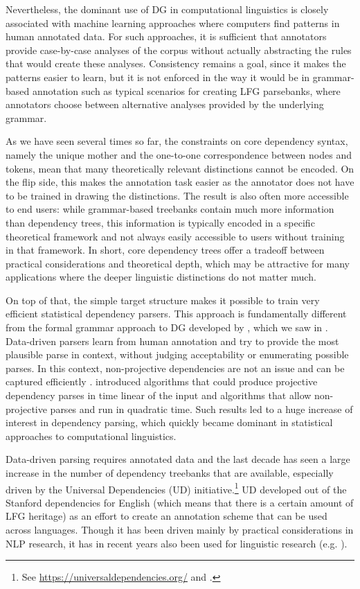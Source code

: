 \documentclass[output=paper,hidelinks]{langscibook}
\begin{document}
Nevertheless, the dominant use of DG in computational linguistics is
closely associated with machine learning approaches where computers
find patterns in human annotated data. For such approaches, it is
sufficient that annotators provide case-by-case analyses of the corpus
without actually abstracting the rules that would create these
analyses. Consistency remains a goal, since it makes the patterns
easier to learn, but it is not enforced in the way it would be in
grammar-based annotation such as typical scenarios for creating LFG
parsebanks, where annotators choose between alternative analyses
provided by the underlying grammar.

As we have seen several times so far, the constraints on core
dependency syntax, namely the unique mother and the one-to-one
correspondence between nodes and tokens, mean that many theoretically
relevant distinctions cannot be encoded. On the flip side, this makes
the annotation task easier as the annotator does not have to be
trained in drawing the distinctions. The result is also often more
accessible to end users: while grammar-based treebanks contain much
more information than dependency trees, this information is typically
encoded in a specific theoretical framework and not always easily accessible to
users without training in that framework. In short, core dependency
trees offer a tradeoff between practical considerations and
theoretical depth, which may be attractive for many applications where
the deeper linguistic distinctions do not matter much.

On top of that, the simple target structure makes it possible to train
very efficient statistical dependency parsers. This approach is
fundamentally different from the formal grammar approach to DG
developed by \citet{Kuhlmann2013}, which we saw in
. Data-driven parsers learn from human
annotation and try to provide the most plausible parse in context,
without judging acceptability or enumerating possible parses. In this
context, non-projective dependencies are not an issue and can be
captured efficiently \citep{mcdonald-etal-2005}. \citet{nivre2008}
introduced algorithms that could produce projective dependency parses
in time linear of the input and algorithms that allow non-projective
parses and run in quadratic time. Such results led to a huge increase
of interest in dependency parsing, which quickly became dominant in
statistical approaches to computational linguistics.

Data-driven parsing requires annotated data and the last decade has
seen a large increase in the number of dependency treebanks that are
available, especially driven by the Universal Dependencies (UD)
initiative.\footnote{See \url{https://universaldependencies.org/} and
\citet{deMarneffeEtAl2021}.} UD developed out of the Stanford
dependencies for English \citep{DeMarneffeManning2008} (which means
that there is a certain amount of LFG heritage) as an effort to create
an annotation scheme that can be used across languages. Though it has
been driven mainly by practical considerations in NLP research,
it has in recent years also been used for linguistic research (e.g. \citealt{Hahn2347,berdicevskis-piperski-2020-corpus}).
\end{document}
